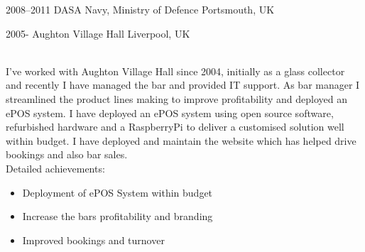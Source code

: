 \documentclass[]{cv-style}          %
\begin{document}
\begin{entrylist}

\entry
  {2008--2011}
  {DASA Navy, Ministry of Defence}
  {Portsmouth, UK}
  {\\
  }
\end{entrylist}
\begin{entrylist}
\entry
  {2005-}
  {Aughton Village Hall}
  {Liverpool, UK}
  {\\{I've worked with Aughton Village Hall since 2004, initially as a glass collector and recently I have managed the bar and provided IT support. As bar manager I streamlined the product lines making to improve profitability and deployed an ePOS system. I have deployed an ePOS system using open source software, refurbished hardware and a RaspberryPi to deliver a customised solution well within budget. I have deployed and maintain the website which has helped drive bookings and also bar sales.\\}
    Detailed achievements:
  \begin{itemize}
    \item Deployment of ePOS System within budget
    \item Increase the bars profitability and branding
    \item Improved bookings and turnover
  \end{itemize}
}
\end{entrylist}





\end{document}
